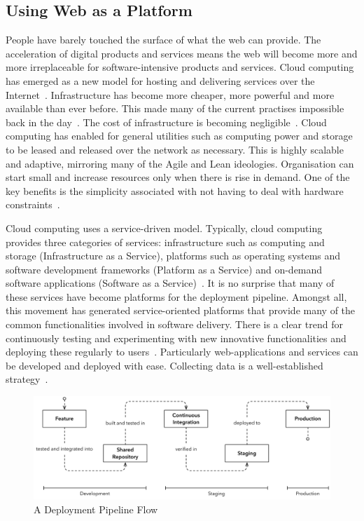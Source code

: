 \documentclass[english]{tktltiki2}
\begin{document}
\subsection{Using Web as a Platform}

People have barely touched the surface of what the web can provide. The acceleration of digital products and services means the web will become more and more irreplaceable for software-intensive products and services. Cloud computing has emerged as a new model for hosting and delivering services over the Internet~\cite{ZCB10}. Infrastructure has become more cheaper, more powerful and more available than ever before. This made many of the current practises impossible back in the day~\cite{Roy70}. The cost of infrastructure is becoming negligible~\cite{ZCB10, Bos12}. Cloud computing has enabled for general utilities such as computing power and storage to be leased and released over the network as necessary. This is highly scalable and adaptive, mirroring many of the Agile and Lean ideologies. Organisation can start small and increase resources only when there is rise in demand. One of the key benefits is the simplicity associated with not having to deal with hardware constraints~\cite{BE12}.

Cloud computing uses a service-driven model. Typically, cloud computing provides three categories of services: infrastructure such as computing and storage (Infrastructure as a Service), platforms such as operating systems and software development frameworks (Platform as a Service) and on-demand software applications (Software as a Service)~\cite{ZCB10}. It is no surprise that many of these services have become platforms for the deployment pipeline. Amongst all, this movement has generated service-oriented platforms that provide many of the common functionalities involved in software delivery. There is a clear trend for continuously testing and experimenting with new innovative functionalities and deploying these regularly to users~\cite{BE12}. Particularly web-applications and services can be developed and deployed with ease. Collecting data is a well-established strategy~\cite{HB14}.

\begin{figure}[h!]

    \centering
    \vspace{1cm}

    \includegraphics[width = \textwidth]{figures/deployment-pipeline-flow}

    \caption{A Deployment Pipeline Flow}
    \label{figure:deployment-pipeline-flow}

    \vspace{1cm}

\end{figure}
\end{document}
